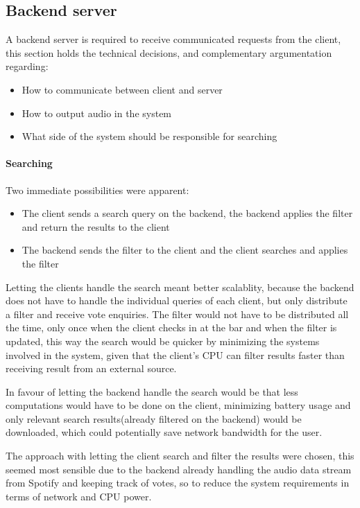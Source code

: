 \subsection{Backend server}

	A backend server is required to receive communicated requests from the client, this section holds the technical decisions, and complementary argumentation regarding: 
	\begin{itemize}
		\item How to communicate between client and server
		\item How to output audio in the system
		\item What side of the system should be responsible for searching
	\end{itemize}

	\paragraph{Searching}
	Two immediate possibilities were apparent: 
	\begin{itemize}
		\item The client sends a search query on the backend, the backend applies the filter and return the results to the client 
		\item The backend sends the filter to the client and the client searches and applies the filter
	\end{itemize}
	Letting the clients handle the search meant better scalablity, because the backend does not have to handle the individual queries of each client, but only distribute a filter and receive vote enquiries. The filter would not have to be distributed all the time, only once when the client checks in at the bar and when the filter is updated, this way the search would be quicker by minimizing the systems involved in the system, given that the client's CPU can filter results faster than receiving result from an external source. 
	
	In favour of letting the backend handle the search would be that less computations would have to be done on the client, minimizing battery usage and only relevant search results(already filtered on the backend) would be downloaded, which could potentially save network bandwidth for the user. 
	
	The approach with letting the client search and filter the results were chosen, this seemed most sensible due to the backend already handling the audio data stream from Spotify and keeping track of votes, so to reduce the system requirements in terms of network and CPU power.

